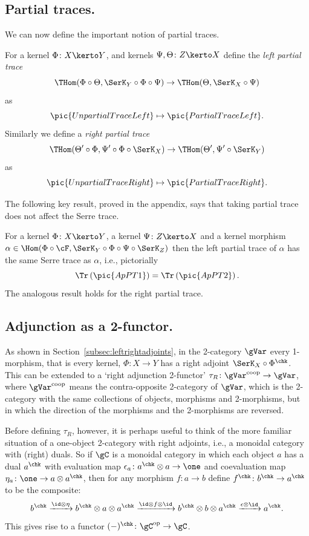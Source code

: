 \subsection{Partial traces.}
We can now define the important notion of partial traces.
\begin{Definition}
   For a kernel $\Phi\colon X\kerto Y$, and
  kernels $\Psi,\Theta\colon Z\kerto X$ define the \emph{left partial trace}
  \[ \THom(\Phi\circ\Theta,\SerK_Y\circ\Phi\circ\Psi) \to
  \THom(\Theta,\SerK_X\circ\Psi) \]
  as
  \[ \pic{UnpartialTraceLeft}\mapsto\pic{PartialTraceLeft}.\]
  Similarly we define a \emph{right partial trace}
  \[ \THom(\Theta'\circ\Phi,\Psi'\circ\Phi\circ\SerK_X) \to
  \THom(\Theta',\Psi'\circ\SerK_Y)\]
  as
  \[ \pic{UnpartialTraceRight}\mapsto\pic{PartialTraceRight}.\]
\end{Definition}
\medskip

\noindent
The following key result, proved in the appendix, says that taking partial
trace does not affect the Serre trace.

\begin{Theorem}
  For a kernel $\Phi\colon X\kerto Y$, a kernel $\Psi\colon Z\kerto X$
  and a kernel morphism
  $\alpha\in\Hom(\Phi\circ\cF,\SerK_Y\circ\Phi\circ\Psi\circ\SerK_Z)$
  then the left partial trace of $\alpha$ has the same Serre trace as
  $\alpha$, i.e., pictorially
  \[\Tr\left(\pic{ApPT1}\right)=\Tr\left(\pic{ApPT2}\right).\]
  The analogous result holds for the right partial trace.
\end{Theorem}

 \subsection{Adjunction as a 2-functor.}
\label{subsec:adj2functors}
As shown in Section~\ref{subsec:leftrightadjoints}, in the
2-cate\-gory $\gVar$ every 1-morphism, that is every kernel,
$\Phi\colon X\to Y$ has a right adjoint $\SerK_X\circ \Phi^\chk$.
This can be extended to a `right adjunction 2-functor' $\tau_R\colon
\gVar^\text{coop}\to \gVar$, where $\gVar^\text{coop}$ means the
contra-opposite 2-category of $\gVar$, which is the 2-category with
the same collections of objects, morphisms and 2-morphisms, but in
which the direction of the morphisms and the 2-morphisms are reversed.


Before defining $\tau_R$, however, it is perhaps useful to think of
the more familiar situation of a one-object 2-category with right
adjoints, i.e., a monoidal category with (right) duals.  So if $\gC$
is a monoidal category in which each object $a$ has a dual $a^\chk$
with evaluation map $\epsilon_a\colon a^\chk\otimes a\to \one$ and
coevaluation map $\eta_a\colon \one \to a\otimes a^\chk$, then for any
morphism $f\colon a\to b$ define $f^\chk\colon b^\chk\to a^\chk$ to be
the composite:
\[b^\chk\xrightarrow{\id\otimes \eta} b^\chk\otimes a\otimes
a^\chk\xrightarrow{\id\otimes f\otimes \id} b^\chk\otimes b\otimes
a^\chk\xrightarrow{\epsilon\otimes \id} a^\chk.\]
This gives rise to a functor $(-)^\chk\colon \gC^\text{op}\to \gC$.



